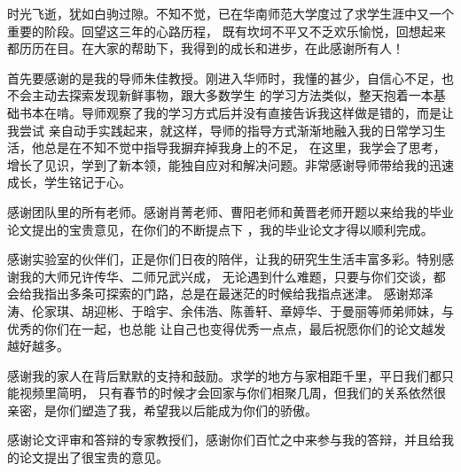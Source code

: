 ﻿\begin{ack}
时光飞逝，犹如白驹过隙。不知不觉，已在华南师范大学度过了求学生涯中又一个重要的阶段。回望这三年的心路历程，%
既有坎坷不平又不乏欢乐愉悦，回想起来都历历在目。在大家的帮助下，我得到的成长和进步，在此感谢所有人！

首先要感谢的是我的导师朱佳教授。刚进入华师时，我懂的甚少，自信心不足，也不会主动去探索发现新鲜事物，跟大多数学生%
的学习方法类似，整天抱着一本基础书本在啃。导师观察了我的学习方式后并没有直接告诉我这样做是错的，而是让我尝试%
亲自动手实践起来，就这样，导师的指导方式渐渐地融入我的日常学习生活，他总是在不知不觉中指导我摒弃掉我身上的不足，%
在这里，我学会了思考，增长了见识，学到了新本领，能独自应对和解决问题。非常感谢导师带给我的迅速成长，学生铭记于心。

感谢团队里的所有老师。感谢肖菁老师、曹阳老师和黄晋老师开题以来给我的毕业论文提出的宝贵意见，在你们的不断提点下%
，我的毕业论文才得以顺利完成。

感谢实验室的伙伴们，正是你们日夜的陪伴，让我的研究生生活丰富多彩。特别感谢我的大师兄许传华、二师兄武兴成，%
无论遇到什么难题，只要与你们交谈，都会给我指出多条可探索的门路，总是在最迷茫的时候给我指点迷津。%
感谢郑泽涛、伦家琪、胡迎彬、于晗宇、余伟浩、陈善轩、章婷华、于曼丽等师弟师妹，与优秀的你们在一起，也总能%
让自己也变得优秀一点点，最后祝愿你们的论文越发越好越多。

感谢我的家人在背后默默的支持和鼓励。求学的地方与家相距千里，平日我们都只能视频里简明，%
只有春节的时候才会回家与你们相聚几周，但我们的关系依然很亲密，是你们塑造了我，希望我以后能成为你们的骄傲。

感谢论文评审和答辩的专家教授们，感谢你们百忙之中来参与我的答辩，并且给我的论文提出了很宝贵的意见。

\end{ack}
